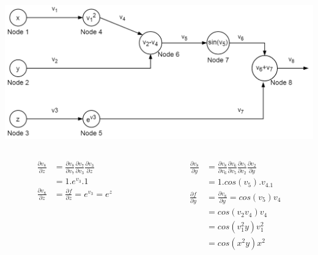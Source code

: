 \begin{frame}{}
	\includegraphics[width=.7\textwidth, center]{figuras/backprop_eg1.png}
	\begin{columns}[T]
		\begin{column}{.5\textwidth}
		
			\begin{align*}
					\frac{\partial v_8}{\partial z}&= 
					\frac{\partial v_8}{\partial v_7} 
					\frac{\partial v_7}{\partial v_3} 
					\frac{\partial v_3}{\partial z}  \\
					&= 1.e^{v_3}.1 \\
					\frac{\partial v_8}{\partial z}&=\frac{\partial f}{\partial z} 
					= e^{v_3}=e^z 
			\end{align*}
		\end{column}
		\begin{column}{.5\textwidth}
			\begin{align*}
			\frac{\partial v_8}{\partial y}&= 
			\frac{\partial v_8}{\partial v_6} 
			\frac{\partial v_6}{\partial v_5} 
			\frac{\partial v_5}{\partial v_2}  
			\frac{\partial v_2}{\partial y}\\
			& = 1.cos(v_5).v_4.1 \\
			\frac{\partial f}{\partial y}&=\frac{\partial v_8}{\partial y}
			= cos(v_5)v_4 \\
			&= cos(v_2v_4)v_4 \\
			&= cos(v^2_1y)v^2_1 \\
			&= cos(x^2y)x^2
			\end{align*}
		\end{column}
	\end{columns}
\end{frame}

